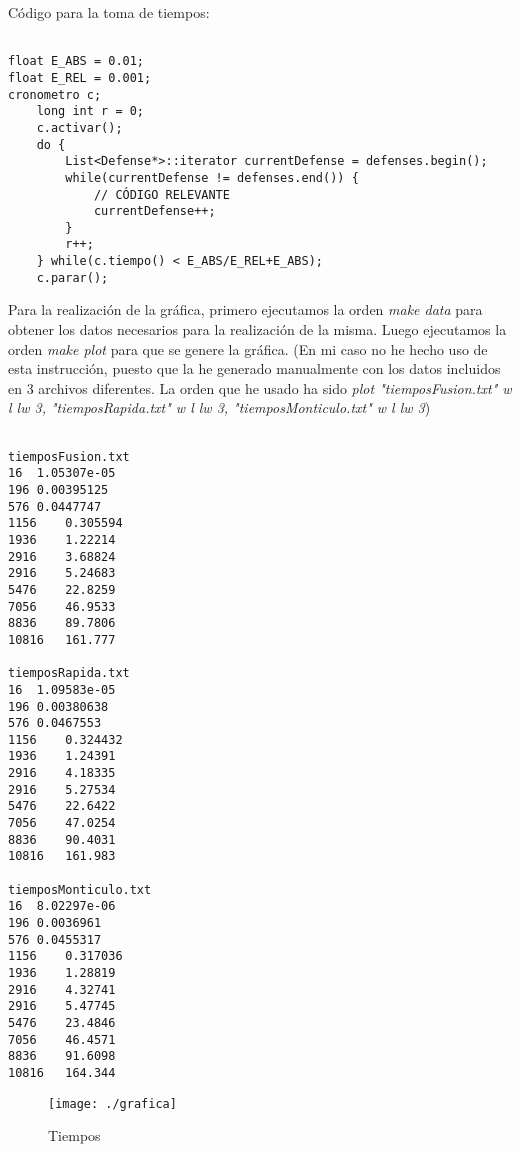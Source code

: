 Código para la toma de tiempos:

\begin{lstlisting}

float E_ABS = 0.01;
float E_REL = 0.001;
cronometro c;
    long int r = 0;
    c.activar();
    do {	
		List<Defense*>::iterator currentDefense = defenses.begin();
		while(currentDefense != defenses.end()) {
			// CÓDIGO RELEVANTE
            currentDefense++;
		}
		r++;
    } while(c.tiempo() < E_ABS/E_REL+E_ABS);
    c.parar();

\end{lstlisting}

Para la realización de la gráfica, primero ejecutamos la orden \textit{make data} para obtener los datos necesarios para la realización de la misma.
Luego ejecutamos la orden \textit{make plot} para que se genere la gráfica. (En mi caso no he hecho uso de esta instrucción, puesto que la he generado manualmente con los datos incluidos en 3 archivos diferentes. La orden que he usado ha sido \textit{plot "tiemposFusion.txt" w l lw 3, "tiemposRapida.txt" w l lw 3, "tiemposMonticulo.txt" w l lw 3})


\begin{lstlisting}

tiemposFusion.txt
16	1.05307e-05
196	0.00395125
576	0.0447747
1156	0.305594
1936	1.22214
2916	3.68824
2916	5.24683
5476	22.8259
7056	46.9533
8836	89.7806
10816	161.777

tiemposRapida.txt
16	1.09583e-05
196	0.00380638
576	0.0467553
1156	0.324432
1936	1.24391
2916	4.18335
2916	5.27534
5476	22.6422
7056	47.0254
8836	90.4031
10816	161.983

tiemposMonticulo.txt
16	8.02297e-06
196	0.0036961
576	0.0455317
1156	0.317036
1936	1.28819
2916	4.32741
2916	5.47745
5476	23.4846
7056	46.4571
8836	91.6098
10816	164.344

\end{lstlisting}

\begin{figure}
\centering
\texttt{[image: ./grafica]}
\caption{Tiempos}
\label{fig:grafica}
\end{figure}
